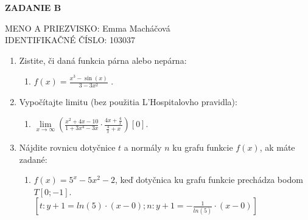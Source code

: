 \documentclass[slovak,12pt,a4paper,fleqn]{article}
\begin{document}
\begin{center}
\LARGE{\bf{ZADANIE B}}
\end{center}

\bigskip


\begin{flushleft}
MENO A PRIEZVISKO: Emma Macháčová \\
IDENTIFIKAČNÉ ČÍSLO: 103037 \\
\end{flushleft}

\bigskip

\begin{enumerate}
\item Zistite, či daná funkcia párna alebo nepárna:
	\begin{enumerate}
	\item $f(x)=\frac{x^3-\sin(x)}{3-3x^2}$ \dotfill [nepárna].
	\end{enumerate}
\item Vypočítajte limitu (bez použitia L'Hospitalovho pravidla):
	\begin{enumerate}
	\item $\lim\limits_{x\to\infty}\left(\frac{x^2+4x-10}{1+3x^4-3x}\cdot\frac{4x+\frac{4}{x}}{\frac{4}{x}+x}\right)$\dotfill $\left[0\right]$.
	\end{enumerate}
\item Nájdite rovnicu dotyčnice $t$ a normály $n$ ku grafu funkcie $f(x)$, ak máte zadané: 
	\begin{enumerate}
	\item $f(x)=5^x-5x^2-2$, keď dotyčnica ku grafu funkcie prechádza bodom $T [0; -1]$.\\
	$\left[t:y+1=ln(5)\cdot(x-0); n:y+1=-\frac{1}{ln(5)}\cdot(x-0)\right]$\\
	\end{enumerate}
\end{enumerate}
\end{document}
